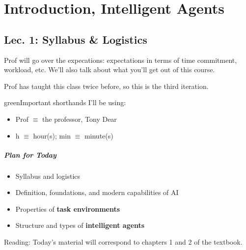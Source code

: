 \chapter{Introduction, Intelligent Agents}

\section{Lec. 1: Syllabus \& Logistics}
Prof will go over the expecations: expectations in terms of time commitment, workload, etc. We'll also talk about what you'll get out of this course.

Prof has taught this class twice before, so this is the third iteration.
\begin{mybox}{green}{Important shorthands I'll be using:}
	\begin{itemize}
	\item Prof $\equiv$ the professor, Tony Dear
	\item h $\equiv$ hour(s); min $\equiv$ minute(s)
	\end{itemize}
\end{mybox}


\paragraph*{Plan for Today}
\begin{itemize}
\item Syllabus and logistics
\item Definition, foundations, and modern capabilities of AI
\item Properties of \textbf{task environments}
\item Structure and types of \textbf{intelligent agents}
\end{itemize}

Reading: Today's material will correspond to chapters 1 and 2 of the textbook.

